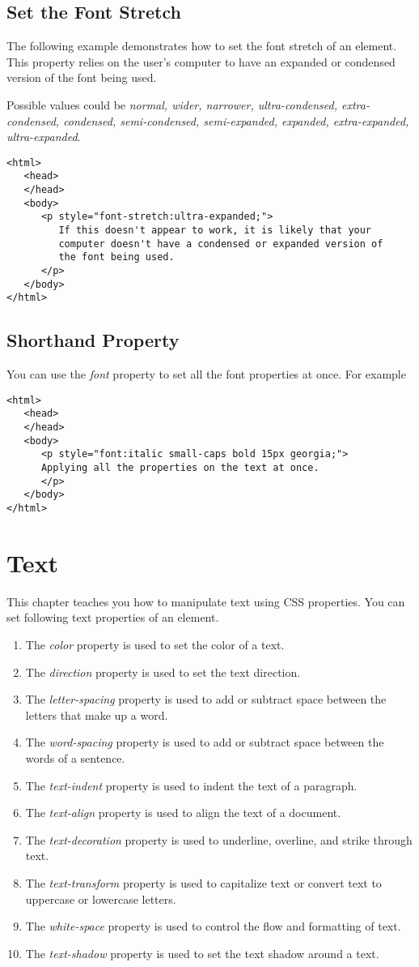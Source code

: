 \documentclass[a4paper,oneside]{book}
\numberwithin{equation}{chapter}
\begin{document}
\subsection{Set the Font Stretch}
The following example demonstrates how to set the font stretch of an element. This property relies on the user's computer to have an expanded or condensed version of the font being used. 

Possible values could be \textit{normal, wider, narrower, ultra-condensed, extra-condensed, condensed, semi-condensed, semi-expanded, expanded, extra-expanded, ultra-expanded}.
\begin{verbatim}
<html>
   <head>
   </head>
   <body>
      <p style="font-stretch:ultra-expanded;">
         If this doesn't appear to work, it is likely that your
         computer doesn't have a condensed or expanded version of
         the font being used.
      </p>
   </body>
</html>
\end{verbatim}
\subsection{Shorthand Property}
You can use the \textit{font} property to set all the font properties at once. For example
\begin{verbatim}
<html>
   <head>
   </head>
   <body>
      <p style="font:italic small-caps bold 15px georgia;">
      Applying all the properties on the text at once.
      </p>
   </body>
</html>
\end{verbatim}
\section{Text}
This chapter teaches you how to manipulate text using CSS properties. You can set following text properties of an element.
\begin{enumerate}
\item The \textit{color} property is used to set the color of a text.
\item The \textit{direction} property is used to set the text direction.
\item The \textit{letter-spacing} property is used to add or subtract space between the letters that make up a word.
\item The \textit{word-spacing} property is used to add or subtract space between the words of a sentence.
\item The \textit{text-indent} property is used to indent the text of a paragraph.
\item The \textit{text-align} property is used to align the text of a document.
\item The \textit{text-decoration} property is used to underline, overline, and strike through text.
\item The \textit{text-transform} property is used to capitalize text or convert text to uppercase or lowercase letters.
\item The \textit{white-space} property is used to control the flow and formatting of text.
\item The \textit{text-shadow} property is used to set the text shadow around a text.
\end{enumerate}
\end{document}
